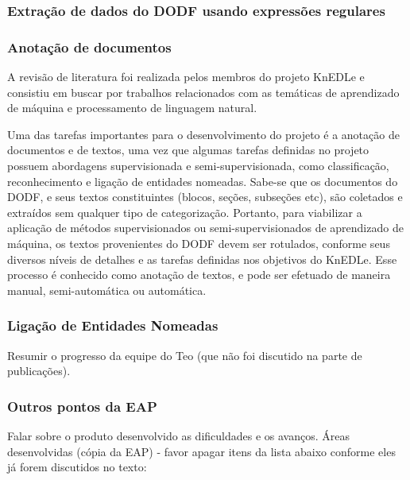 \documentclass[12pt]{article}
\begin{document}
\subsubsection*{Extração de dados do DODF usando expressões regulares}

\subsubsection*{Anotação de documentos}

A revisão de literatura foi realizada pelos membros do projeto KnEDLe e consistiu em buscar por trabalhos relacionados com as temáticas de aprendizado de máquina e processamento de linguagem natural.

Uma das tarefas importantes para o desenvolvimento do projeto é a anotação de documentos e de textos, uma vez que algumas tarefas definidas no projeto possuem abordagens supervisionada e semi-supervisionada, como classificação, reconhecimento e ligação de entidades nomeadas. Sabe-se que os documentos do DODF, e seus textos constituintes (blocos, seções, subseções etc), são coletados e extraídos sem qualquer tipo de categorização. Portanto, para viabilizar a aplicação de métodos supervisionados ou semi-supervisionados de aprendizado de máquina, os textos provenientes do DODF devem ser rotulados, conforme seus diversos níveis de detalhes e as tarefas definidas nos objetivos do KnEDLe. Esse processo é conhecido como anotação de textos, e pode ser efetuado de maneira manual, semi-automática ou automática. 


\subsubsection*{Ligação de Entidades Nomeadas}
	Resumir o progresso da equipe do Teo (que não foi discutido na parte de publicações).

\subsubsection*{Outros pontos da EAP}
Falar sobre o produto desenvolvido as dificuldades e os avanços.
Áreas desenvolvidas (cópia da EAP) - favor apagar itens da lista abaixo conforme eles já forem discutidos no texto:
\end{document}
